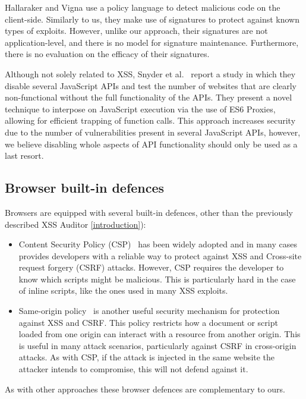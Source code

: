 Hallaraker and Vigna \cite{Hallaraker:2005:DMJ:1078029.1078861} use a policy language to detect malicious code on the client-side. Similarly to us, they make use of signatures to protect against known types of exploits. However, unlike our approach, their signatures are not application-level, and there is no model for signature maintenance. Furthermore, there is no evaluation on the efficacy of their signatures. 

Although not solely related to \ac{XSS}, Snyder et al.~\cite{Snyder:2017:MWD:3133956.3133966} report a study in which they disable several JavaScript APIs and test the number of websites that are clearly non-functional without the full functionality of the APIs. They present a novel technique to interpose on JavaScript execution via the use of ES6 Proxies, allowing for efficient trapping of function calls. This approach increases security due to the number of vulnerabilities present in several JavaScript APIs, however, we believe disabling whole aspects of API functionality should only be used as a last resort.

\subsection{Browser built-in defences}
Browsers are equipped with several built-in defences, other than the previously described XSS Auditor \ref{introduction}):
\begin{itemize}
	\item Content Security Policy (CSP)~\cite{CSP} has been widely adopted and in many cases provides developers with a reliable way to protect against \ac{XSS} and Cross-site request forgery (CSRF) attacks. However, CSP requires the developer to know which scripts might be malicious. This is particularly hard in the case of inline scripts, like the ones used in many \ac{XSS} exploits.
	\item Same-origin policy~\cite{SOP} is another useful security mechanism for protection against \ac{XSS} and CSRF. This policy restricts how a document or script loaded from one origin can interact with a resource from another origin. This is useful in many attack scenarios, particularly against CSRF in cross-origin attacks. As with CSP, if the attack is injected in the same website the attacker intends to compromise, this will not defend against it.
\end{itemize}

As with other approaches these browser defences are complementary to ours.

